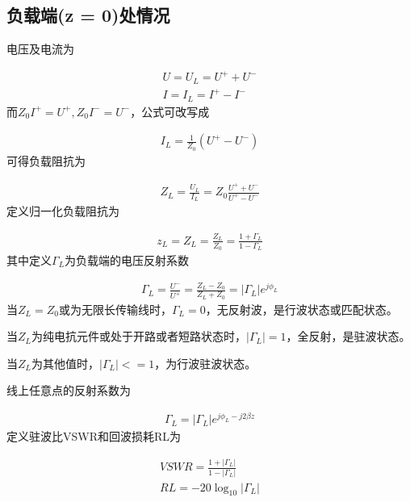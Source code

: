 \documentclass{zjureport}
\begin{document}
\subsection{负载端(z = 0)处情况}
电压及电流为\par
\begin{align*}
  U = U_L = U^+ + U^- \\
  I = I_L = I^+ - I^-
\end{align*}
而$Z_0I^+ = U^+,Z_0I^- = U^-$，公式可改写成\par
\begin{align*}
  I_L = \frac{1}{Z_0}(U^+-U^-)
\end{align*}
可得负载阻抗为\par
\begin{align*}
  Z_L = \frac{U_L}{I_L} = Z_0\frac{U^+ + U^-}{U^+ - U^-}
\end{align*}
定义归一化负载阻抗为\par
\begin{align*}
  z_L = Z_L = \frac{Z_L}{Z_0} = \frac{1+\Gamma_L}{1-\Gamma_L}
\end{align*}
其中定义$\Gamma_L$为负载端的电压反射系数\par
\begin{align*}
  \Gamma_L = \frac{U^-}{U^+} = \frac{Z_L - Z_0}{Z_L + Z_0} = |\Gamma_L|e^{j\phi_L}
\end{align*}
当$Z_L = Z_0$或为无限长传输线时，$\Gamma_L = 0$，无反射波，是行波状态或匹配状态。\par
当$Z_L$为纯电抗元件或处于开路或者短路状态时，$|\Gamma_L| = 1$，全反射，是驻波状态。\par
当$Z_L$为其他值时，$|\Gamma_L| <= 1$，为行波驻波状态。\par
线上任意点的反射系数为\par
\begin{align*}
  \Gamma_L = |\Gamma_L|e^{j\phi_L-j2\beta z}
\end{align*}
定义驻波比VSWR和回波损耗RL为\par
\begin{align*}
  VSWR = \frac{1+|\Gamma_L|}{1-|\Gamma_L|}\\
  RL = -20\log_{10}|\Gamma_L|
\end{align*}
\end{document}
